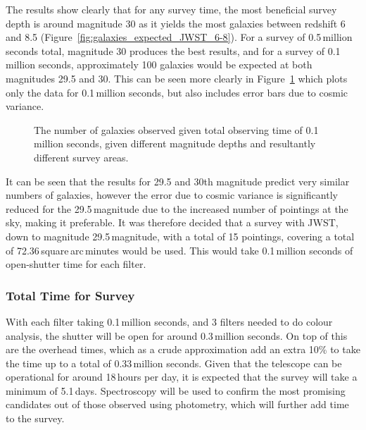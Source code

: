 		The results show clearly that for any survey time, the most beneficial survey depth is around magnitude 30 as it yields the most galaxies between redshift 6 and 8.5 (Figure~\ref{fig:galaxies_expected_JWST_6-8}). For a survey of 0.5\,million seconds total, magnitude 30 produces the best results, and for a survey of 0.1\,million seconds, approximately 100 galaxies would be expected at both magnitudes 29.5 and 30. This can be seen more clearly in Figure~\ref{fig:galaxies_expected_JWST_errors} which plots only the data for 0.1\,million seconds, but also includes error bars due to cosmic variance.
		\begin{figure}[!htbp]
			\centering
				\begingroup{}
					\resizebox{0.8\textwidth}{!}{%
						
					}\endgroup
			\caption{The number of galaxies observed given total observing time of 0.1\,million seconds, given different magnitude depths and resultantly different survey areas.\label{fig:galaxies_expected_JWST_errors}}
		\end{figure}

		It can be seen that the results for 29.5 and 30th magnitude predict very similar numbers of galaxies, however the error due to cosmic variance is significantly reduced for the 29.5\,magnitude due to the increased number of pointings at the sky, making it preferable. It was therefore decided that a survey with JWST, down to magnitude 29.5\,magnitude, with a total of 15 pointings, covering a total of 72.36\,square\,arc\,minutes would be used. This would take 0.1\,million seconds of open-shutter time for each filter.

	\subsubsection{Total Time for Survey} %
	\label{sub:total_time_for_survey}
		With each filter taking 0.1\,million seconds, and 3 filters needed to do colour analysis, the shutter will be open for around 0.3\,million seconds. On top of this are the overhead times, which as a crude approximation add an extra 10\% to take the time up to a total of 0.33\,million seconds. Given that the telescope can be operational for around 18\,hours per day, it is expected that the survey will take a minimum of 5.1\,days. Spectroscopy will be used to confirm the most promising candidates out of those observed using photometry, which will further add time to the survey.
